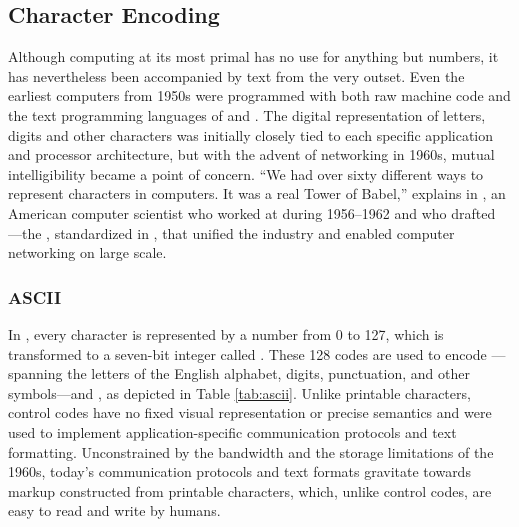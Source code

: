 \documentclass{book}
\begin{document}
\subsection{Character Encoding}
Although computing at its most primal has no use for anything but numbers, it
has nevertheless been accompanied by text from the very outset. Even the
earliest computers from 1950s were programmed with both raw machine code and
the text programming languages of  and . The
digital representation of letters, digits and other characters was initially
closely tied to each specific application and processor architecture, but with
the advent of networking in 1960s, mutual intelligibility became a point of
concern. ``We had over sixty different ways to represent characters in
computers. It was a real Tower of Babel,'' explains in \cite{brandel99}
, an American computer scientist who worked at 
during 1956--1962 and who drafted ---the , standardized in \cite{asa63}, that unified the industry and enabled
computer networking on large scale.

\subsubsection{ASCII}
In , every character is represented by a number from 0 to 127,
which is transformed to a seven-bit integer called . These 128 codes are used to encode ---spanning the letters of the English alphabet, digits,
punctuation, and other symbols---and , as depicted in
Table \ref{tab:ascii}. Unlike printable characters, control codes have no fixed
visual representation or precise semantics and were used to implement
application-specific communication protocols and text formatting. Unconstrained
by the bandwidth and the storage limitations of the 1960s, today's communication
protocols and text formats gravitate towards markup constructed from printable
characters, which, unlike control codes, are easy to read and write by humans.

\end{document}
